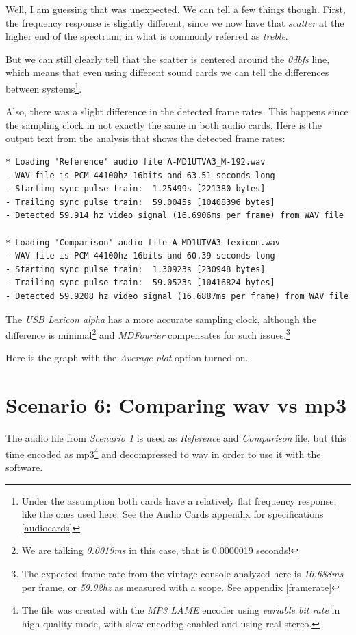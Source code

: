 \documentclass[10pt,a4paper]{report}
\newcommand{\fhz}[1]{\textit{#1\acrshort{hz}}}
\newcommand{\db}[1]{\textit{#1\acrshort{dbfs}}}
\begin{document}
Well, I am guessing that was unexpected. We can tell a few things though. First, the frequency response is slightly different, since we now have that \textit{scatter} at the higher end of the spectrum, in what is commonly referred as \textit{treble}.

But we can still clearly tell that the scatter is centered around the \db{0} line, which means that even using different sound cards we can tell the differences between systems\footnote{Under the assumption both cards have a relatively flat frequency response, like the ones used here. See the Audio Cards appendix for specifications \ref{audiocards}}. 

Also, there was a slight difference in the detected frame rates. This happens since the sampling clock in not exactly the same in both audio cards. Here is the output text from the analysis that shows the detected frame rates:

\begin{verbatim}
* Loading 'Reference' audio file A-MD1UTVA3_M-192.wav
- WAV file is PCM 44100hz 16bits and 63.51 seconds long
- Starting sync pulse train:  1.25499s [221380 bytes]
- Trailing sync pulse train:  59.0045s [10408396 bytes]
- Detected 59.914 hz video signal (16.6906ms per frame) from WAV file

* Loading 'Comparison' audio file A-MD1UTVA3-lexicon.wav
- WAV file is PCM 44100hz 16bits and 60.39 seconds long
- Starting sync pulse train:  1.30923s [230948 bytes]
- Trailing sync pulse train:  59.0523s [10416824 bytes]
- Detected 59.9208 hz video signal (16.6887ms per frame) from WAV file
\end{verbatim}

The \textit{USB Lexicon alpha} has a more accurate sampling clock, although the difference is minimal\footnote{We are talking \textit{0.0019\acrshort{ms}} in this case, that is 0.0000019 seconds!} and \textit{MDFourier} compensates for such issues.\footnote{The expected frame rate from the vintage console analyzed here is \textit{16.688\acrshort{ms}} per frame, or \fhz{59.92} as measured with a scope. See appendix \ref{framerate}}

Here is the graph with the \textit{Average plot} option turned on.

\section{Scenario 6: Comparing wav vs mp3}
\label{mp3}

The audio file from \textit{Scenario 1} is used as \textit{Reference} and \textit{Comparison} file, but this time encoded as \acrshort{mp3}\footnote{The file was created with the \textit{MP3 LAME} encoder using \textit{variable bit rate} in high quality mode, with slow encoding enabled and using real stereo.} and decompressed to \acrshort{wav} in order to use it with the software.
\end{document}
